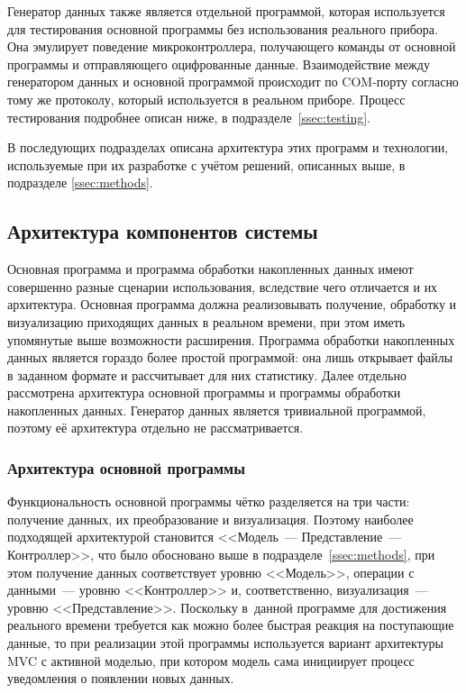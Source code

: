 \documentclass[a4paper, 14pt, titlepage]{extarticle}
\begin{document}
  Генератор данных также является отдельной программой, которая используется для тестирования
  основной программы без использования реального прибора. Она эмулирует поведение микроконтроллера,
  получающего команды от основной программы и отправляющего оцифрованные данные. Взаимодействие
  между генератором данных и основной программой происходит по COM-порту согласно тому же протоколу,
  который используется в реальном приборе. Процесс тестирования подробнее описан ниже, в подразделе~\ref{ssec:testing}.

  В последующих подразделах описана архитектура этих программ и технологии, используемые при их
  разработке с учётом решений, описанных выше, в подразделе \ref{ssec:methods}.

  \subsection{Архитектура компонентов системы}\label{ssec:arch}

  Основная программа и программа обработки накопленных данных имеют совершенно разные сценарии
  использования, вследствие чего отличается и их архитектура. Основная программа должна
  реализовывать получение, обработку и визуализацию приходящих данных в реальном времени, при этом
  иметь упомянутые выше возможности расширения. Программа обработки накопленных данных является
  гораздо более простой программой: она лишь открывает файлы в заданном формате и рассчитывает для
  них статистику. Далее отдельно рассмотрена архитектура основной программы и программы обработки
  накопленных данных. Генератор данных является тривиальной программой, поэтому её архитектура
  отдельно не рассматривается.

  \subsubsection{Архитектура основной программы}\label{sssec:main-arch}

  Функциональность основной программы чётко разделяется на три части: получение данных, их
  преобразование и визуализация. Поэтому наиболее подходящей архитектурой становится <<Модель~---
  Представление~--- Контроллер>>, что было обосновано выше в подразделе~\ref{ssec:methods}, при этом
  получение данных соответствует уровню <<Модель>>, операции с данными~--- уровню <<Контроллер>> и,
  соответственно, визуализация~--- уровню <<Представление>>.  Поскольку в~данной программе для
  достижения реального времени требуется как можно более быстрая реакция на поступающие данные, то
  при реализации этой программы используется вариант архитектуры MVC с активной моделью,
  при котором модель сама инициирует процесс уведомления о появлении новых данных.
\end{document}
